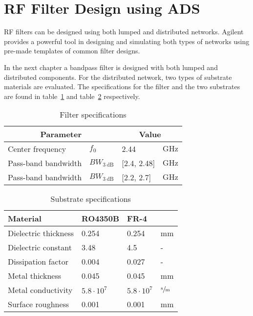 \documentclass[report.tex]{subfiles}
\begin{document}
\pagebreak \section{RF Filter Design using ADS}
RF filters can be designed using both lumped and distributed networks. Agilent provides a powerful tool in designing and simulating both types of networks using pre-made templates of common filter designs.

In the next chapter a bandpass filter is designed with both lumped and distributed components. For the distributed network, two types of substrate materials are evaluated. The specifications for the filter and the two substrates are found in table~\ref{table:filter specs} and table~\ref{table:substrate specs} respectively.

\begin{table}[h]
    \centering
    \caption{Filter specifications}
    \begin{tabular}{l l l l}
        \multicolumn{2}{c}{Parameter} & \multicolumn{2}{c}{Value}\\
        \hline
        Center frequency & $f_0$ & 2.44 & $\text{GHz}$\\
        Pass-band bandwidth & $BW_{3~\text{dB}}$ & [2.4, 2.48] & $\text{GHz}$\\
        Pass-band bandwidth & $BW_{3~\text{dB}}$ & [2.2, 2.7]  & $\text{GHz}$\\
    \end{tabular}
    \label{table:filter specs}
\end{table}

\begin{table}[h]
    \centering
    \caption{Substrate specifications}
    \begin{tabular}{l l l l}
        Material & RO4350B & FR-4 & \\
        \hline
        Dielectric thickness & 0.254 & 0.254 & mm\\
        Dielectric constant  & 3.48  & 4.5   & -\\
        Dissipation factor   & 0.004 & 0.027 & -\\
        Metal thickness      & 0.045 & 0.045 & mm\\
        Metal conductivity   & $5.8 \cdot 10^{7}$ & $5.8 \cdot 10^{7}$ & $\sfrac{\text{s}}{\text{m}}$\\
        Surface roughness    & 0.001 & 0.001 & mm\\
    \end{tabular}
    \label{table:substrate specs}
\end{table}








\end{document}
